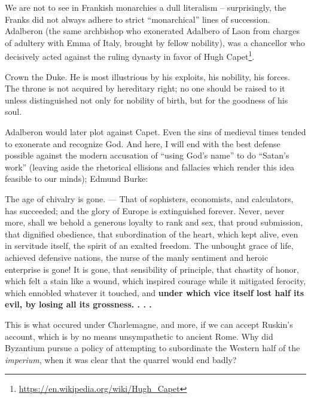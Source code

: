 We are not to see in Frankish monarchies a dull literalism -- surprisingly, the Franks did not always adhere to strict ``monarchical'' lines of succession. Adalberon (the same archbishop who exonerated Adalbero of Laon from charges of adultery with Emma of Italy, brought by fellow nobility), was a chancellor who decisively acted against the ruling dynasty in favor of Hugh Capet\footnote{\url{https://en.wikipedia.org/wiki/Hugh\_Capet}}.

\begin{quotex}
Crown the Duke. He is most illustrious by his exploits, his nobility, his forces. The throne is not acquired by hereditary right; no one should be raised to it unless distinguished not only for nobility of birth, but for the goodness of his soul.
\end{quotex}


Adalberon would later plot against Capet. Even the sins of medieval times tended to exonerate and recognize God. And here, I will end with the best defense possible against the modern accusation of ``using God's name'' to do ``Satan's work'' (leaving aside the rhetorical ellisions and fallacies which render this idea feasible to our minds); Edmund Burke:

\begin{quotex}
The age of chivalry is gone. --- That of sophisters, economists, and calculators, has succeeded; and the glory of Europe is extinguished forever. Never, never more, shall we behold a generous loyalty to rank and sex, that proud submission, that dignified obedience, that subordination of the heart, which kept alive, even in servitude itself, the spirit of an exalted freedom. The unbought grace of life, achieved defensive nations, the nurse of the manly sentiment and heroic enterprise is gone! It is gone, that sensibility of principle, that chastity of honor, which felt a stain like a wound, which inspired courage while it mitigated ferocity, which ennobled whatever it touched, and \textbf{under which vice itself lost half its evil, by losing all its grossness. . . .}
\end{quotex}


This is what occured under Charlemagne, and more, if we can accept Ruskin's account, which is by no means unsympathetic to ancient Rome. Why did Byzantium pursue a policy of attempting to subordinate the Western half of the \emph{imperium}, when it was clear that the quarrel would end badly?



